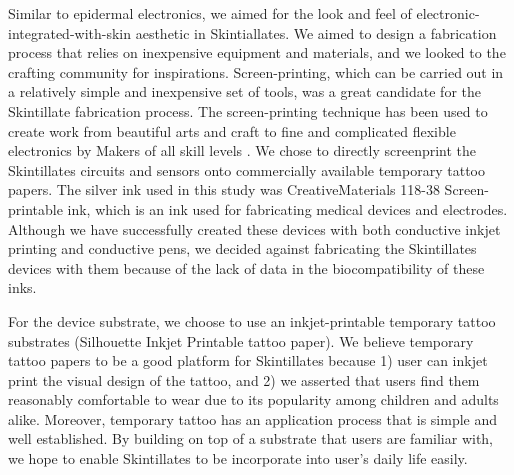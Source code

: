 \documentclass{sigchi}
\begin{document}
Similar to epidermal electronics, we aimed for the look and feel of electronic-integrated-with-skin aesthetic in Skintiallates. We aimed to design a fabrication process that relies on inexpensive equipment and materials, and we looked to the crafting community for inspirations. Screen-printing, which can be carried out in a relatively simple and inexpensive set of tools, was a great candidate for the Skintillate fabrication process. The screen-printing technique has been used to create work from beautiful arts and craft to fine and complicated flexible electronics by Makers of all skill levels \cite{Olberding:2014ds}. We chose to directly screenprint the Skintillates circuits and sensors onto commercially available temporary tattoo papers. The silver ink used in this study was CreativeMaterials 118-38 Screen-printable ink, which is an ink used for fabricating medical devices and electrodes. Although we have successfully created these devices with both conductive inkjet printing and conductive pens, we decided against fabricating the Skintillates devices with them because of the lack of data in the biocompatibility of these inks. 

For the device substrate, we choose to use an inkjet-printable temporary tattoo substrates (Silhouette Inkjet Printable tattoo paper). We believe temporary tattoo papers to be a good platform for Skintillates because 1) user can inkjet print the visual design of the tattoo, and 2) we asserted that users find them reasonably comfortable to wear due to its popularity among children and adults alike. Moreover, temporary tattoo has an application process that is simple and well established. By building on top of a substrate that users are familiar with, we hope to enable Skintillates to be incorporate into user's daily life easily.
\end{document}
